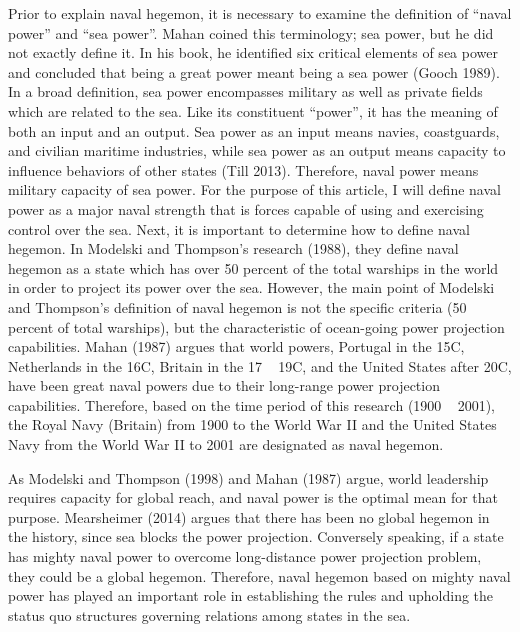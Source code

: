 \documentclass{article}
\begin{document}
Prior to explain naval hegemon, it is necessary to examine the definition of “naval power” and “sea power”. Mahan coined this terminology; sea power, but he did not exactly define it. In his book, he identified six critical elements  of sea power and concluded that being a great power meant being a sea power (Gooch 1989). In a broad definition, sea power encompasses military as well as private fields which are related to the sea. Like its constituent “power”, it has the meaning of both an input and an output. Sea power as an input means navies, coastguards, and civilian maritime industries, while sea power as an output means capacity to influence behaviors of other states (Till 2013). Therefore, naval power means military capacity of sea power. For the purpose of this article, I will define naval power as a major naval strength that is forces capable of using and exercising control over the sea. Next, it is important to determine how to define naval hegemon. In Modelski and Thompson’s research (1988), they define naval hegemon as a state which has over 50 percent of the total warships in the world in order to project its power over the sea. However, the main point of Modelski and Thompson’s definition of naval hegemon is not the specific criteria (50 percent of total warships), but the characteristic of ocean-going power projection capabilities. Mahan (1987) argues that world powers, Portugal in the 15C, Netherlands in the 16C, Britain in the 17 ~ 19C, and the United States after 20C, have been great naval powers due to their long-range power projection capabilities. Therefore, based on the time period of this research (1900 ~ 2001), the Royal Navy (Britain) from 1900 to the World War II and the United States Navy from the World War II to 2001 are designated as naval hegemon. 

As Modelski and Thompson (1998) and Mahan (1987) argue, world leadership requires capacity for global reach, and naval power is the optimal mean for that purpose. Mearsheimer (2014) argues that there has been no global hegemon in the history, since sea blocks the power projection. Conversely speaking, if a state has mighty naval power to overcome long-distance power projection problem, they could be a global hegemon. Therefore, naval hegemon based on mighty naval power has played an important role in establishing the rules and upholding the status quo structures governing relations among states in the sea. 
\end{document}
